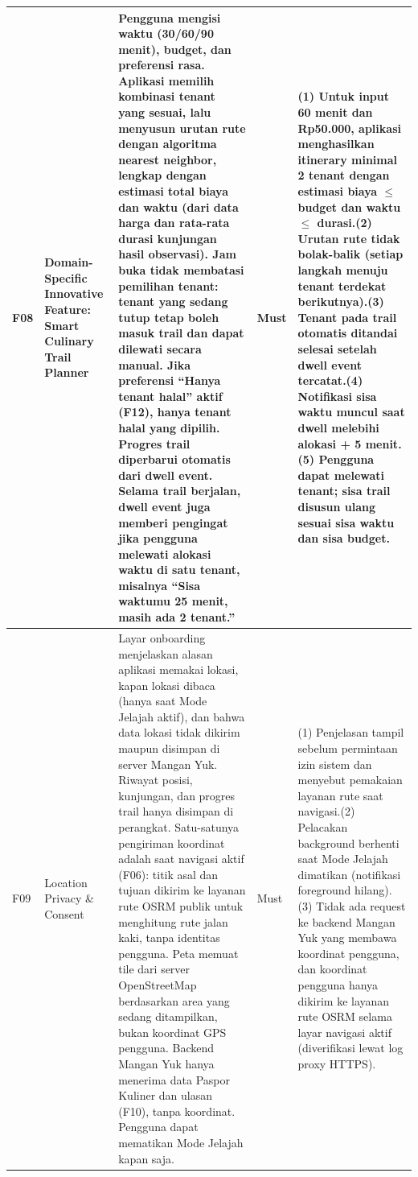 \begin{longtable}{|L{0.075}|L{0.226}|L{0.299}|L{0.093}|L{0.307}|}
F08 & Domain-Specific Innovative Feature: Smart Culinary Trail Planner & Pengguna mengisi waktu (30/60/90 menit), budget, dan preferensi rasa. Aplikasi memilih kombinasi tenant yang sesuai, lalu menyusun urutan rute dengan algoritma nearest neighbor, lengkap dengan estimasi total biaya dan waktu (dari data harga dan rata-rata durasi kunjungan hasil observasi). Jam buka tidak membatasi pemilihan tenant: tenant yang sedang tutup tetap boleh masuk trail dan dapat dilewati secara manual. Jika preferensi ``Hanya tenant halal'' aktif (F12), hanya tenant halal yang dipilih. Progres trail diperbarui otomatis dari dwell event. Selama trail berjalan, dwell event juga memberi pengingat jika pengguna melewati alokasi waktu di satu tenant, misalnya ``Sisa waktumu 25 menit, masih ada 2 tenant.'' & Must & (1) Untuk input 60 menit dan Rp50.000, aplikasi menghasilkan itinerary minimal 2 tenant dengan estimasi biaya \(\le\) budget dan waktu \(\le\) durasi.\newline (2) Urutan rute tidak bolak-balik (setiap langkah menuju tenant terdekat berikutnya).\newline (3) Tenant pada trail otomatis ditandai selesai setelah dwell event tercatat.\newline (4) Notifikasi sisa waktu muncul saat dwell melebihi alokasi + 5 menit.\newline (5) Pengguna dapat melewati tenant; sisa trail disusun ulang sesuai sisa waktu dan sisa budget. \\ \hline
F09 & Location Privacy \& Consent & Layar onboarding menjelaskan alasan aplikasi memakai lokasi, kapan lokasi dibaca (hanya saat Mode Jelajah aktif), dan bahwa data lokasi tidak dikirim maupun disimpan di server Mangan Yuk. Riwayat posisi, kunjungan, dan progres trail hanya disimpan di perangkat. Satu-satunya pengiriman koordinat adalah saat navigasi aktif (F06): titik asal dan tujuan dikirim ke layanan rute OSRM publik untuk menghitung rute jalan kaki, tanpa identitas pengguna. Peta memuat tile dari server OpenStreetMap berdasarkan area yang sedang ditampilkan, bukan koordinat GPS pengguna. Backend Mangan Yuk hanya menerima data Paspor Kuliner dan ulasan (F10), tanpa koordinat. Pengguna dapat mematikan Mode Jelajah kapan saja. & Must & (1) Penjelasan tampil sebelum permintaan izin sistem dan menyebut pemakaian layanan rute saat navigasi.\newline (2) Pelacakan background berhenti saat Mode Jelajah dimatikan (notifikasi foreground hilang).\newline (3) Tidak ada request ke backend Mangan Yuk yang membawa koordinat pengguna, dan koordinat pengguna hanya dikirim ke layanan rute OSRM selama layar navigasi aktif (diverifikasi lewat log proxy HTTPS). \\ \hline
\end{longtable}

